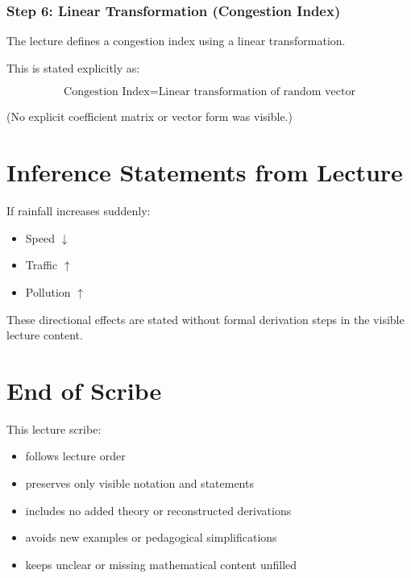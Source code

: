 \documentclass[12pt]{article}
\begin{document}
\subsubsection*{Step 6: Linear Transformation (Congestion Index)}

The lecture defines a congestion index using a linear transformation.

This is stated explicitly as:

\[
\text{Congestion Index} = \text{Linear transformation of random vector}
\]

(No explicit coefficient matrix or vector form was visible.)

\section*{Inference Statements from Lecture}

If rainfall increases suddenly:

\begin{itemize}
\item Speed $\downarrow$
\item Traffic $\uparrow$
\item Pollution $\uparrow$
\end{itemize}

These directional effects are stated without formal derivation steps in the visible lecture content.

\section*{End of Scribe}

This lecture scribe:

\begin{itemize}
\item follows lecture order
\item preserves only visible notation and statements
\item includes no added theory or reconstructed derivations
\item avoids new examples or pedagogical simplifications
\item keeps unclear or missing mathematical content unfilled
\end{itemize}
\end{document}

